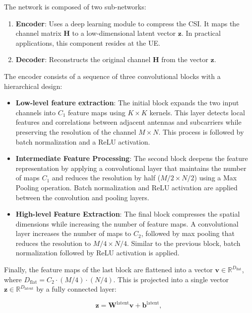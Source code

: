 The network is composed of two sub-networks:

\begin{enumerate}
    \item \textbf{Encoder}: Uses a deep learning module to compress the CSI. It maps the channel matrix $\mathbf{H}$ to a low-dimensional latent vector $\mathbf{z}$. In practical applications, this component resides at the UE.
    \item \textbf{Decoder}: Reconstructs the original channel $\mathbf{H}$ from the vector $\mathbf{z}$.
\end{enumerate}

The encoder consists of a sequence of three convolutional blocks with a hierarchical design:

\begin{itemize}
    \item \textbf{Low-level feature extraction}: The initial block expands the two input channels into $C_1$ feature maps using $K \times K$ kernels. This layer detects local features and correlations between adjacent antennas and subcarriers while preserving the resolution of the channel $M \times N$. This process is followed by batch normalization and a ReLU activation.
    \item \textbf{Intermediate Feature Processing}: The second block deepens the feature representation by applying a convolutional layer that maintains the number of maps $C_1$ and reduces the resolution by half ($M/2 \times N/2$) using a Max Pooling operation. Batch normalization and ReLU activation are applied between the convolution and pooling layers.
    \item \textbf{High-level Feature Extraction}: The final block compresses the spatial dimensions while increasing the number of feature maps. A convolutional layer increases the number of maps to $C_2$, followed by max pooling that reduces the resolution to $M/4 \times N/4$. Similar to the previous block, batch normalization followed by ReLU activation is applied.
\end{itemize}

Finally, the feature maps of the last block are flattened into a vector $\mathbf{v} \in \mathbb{R}^{D_{\text{flat}}}$, where $D_{\text{flat}} = C_2 \cdot (M/4) \cdot (N/4)$. This is projected into a single vector $\mathbf{z} \in \mathbb{R}^{D_{\text{latent}}}$ by a fully connected layer:

\begin{equation}
    \mathbf{z} = \mathbf{W}^{\text{latent}} \mathbf{v} + \mathbf{b}^{\text{latent}},
\end{equation}

